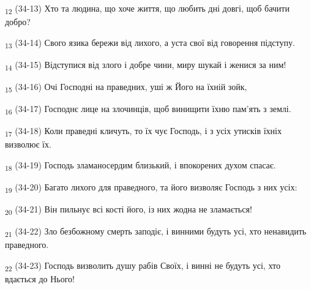 \begin{tcolorbox}
\textsubscript{12} (34-13) Хто та людина, що хоче життя, що любить дні довгі, щоб бачити добро?
\end{tcolorbox}
\begin{tcolorbox}
\textsubscript{13} (34-14) Свого язика бережи від лихого, а уста свої від говорення підступу.
\end{tcolorbox}
\begin{tcolorbox}
\textsubscript{14} (34-15) Відступися від злого і добре чини, миру шукай і женися за ним!
\end{tcolorbox}
\begin{tcolorbox}
\textsubscript{15} (34-16) Очі Господні на праведних, уші ж Його на їхній зойк,
\end{tcolorbox}
\begin{tcolorbox}
\textsubscript{16} (34-17) Господнє лице на злочинців, щоб винищити їхню пам'ять з землі.
\end{tcolorbox}
\begin{tcolorbox}
\textsubscript{17} (34-18) Коли праведні кличуть, то їх чує Господь, і з усіх утисків їхніх визволює їх.
\end{tcolorbox}
\begin{tcolorbox}
\textsubscript{18} (34-19) Господь зламаносердим близький, і впокорених духом спасає.
\end{tcolorbox}
\begin{tcolorbox}
\textsubscript{19} (34-20) Багато лихого для праведного, та його визволяє Господь з них усіх:
\end{tcolorbox}
\begin{tcolorbox}
\textsubscript{20} (34-21) Він пильнує всі кості його, із них жодна не зламається!
\end{tcolorbox}
\begin{tcolorbox}
\textsubscript{21} (34-22) Зло безбожному смерть заподіє, і винними будуть усі, хто ненавидить праведного.
\end{tcolorbox}
\begin{tcolorbox}
\textsubscript{22} (34-23) Господь визволить душу рабів Своїх, і винні не будуть усі, хто вдається до Нього!
\end{tcolorbox}
